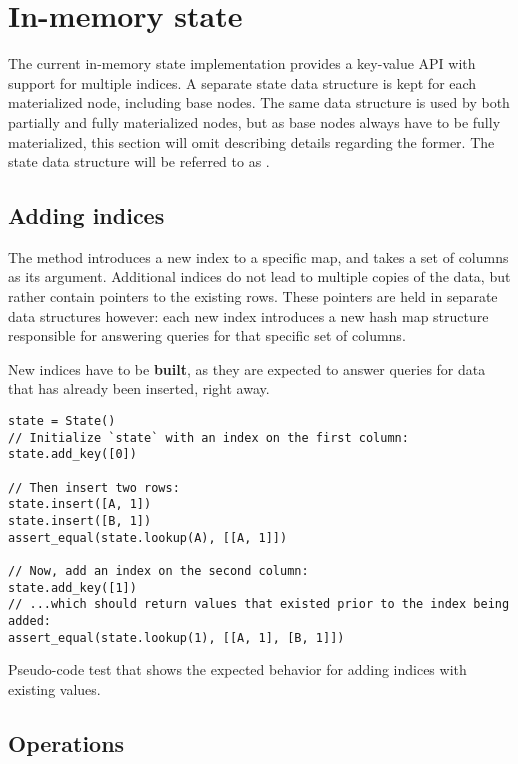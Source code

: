 \newpage

\section{In-memory state}\label{sec:in-memory-state}

The current in-memory state implementation provides a key-value API with support
for multiple indices. A separate state data structure is kept for each
materialized node, including base nodes. The same data structure is used by both
partially and fully materialized nodes, but as base nodes always have to be
fully materialized, this section will omit describing details regarding the
former. The state data structure will be referred to as .

\subsection{Adding indices}
The  method introduces a new index to a specific  map,
and takes a set of columns as its argument. Additional indices do not lead to
multiple copies of the data, but rather contain pointers to the existing rows.
These pointers are held in separate data structures however: each new index
introduces a new hash map structure responsible for answering queries for that
specific set of columns.

New indices have to be \textbf{built}, as they are expected to answer queries
for data that has already been inserted, right away.

\begin{listing}[H]
  \begin{verbatim}
state = State()
// Initialize `state` with an index on the first column:
state.add_key([0])

// Then insert two rows:
state.insert([A, 1])
state.insert([B, 1])
assert_equal(state.lookup(A), [[A, 1]])

// Now, add an index on the second column:
state.add_key([1])
// ...which should return values that existed prior to the index being added:
assert_equal(state.lookup(1), [[A, 1], [B, 1]])
  \end{verbatim}

  \caption{Pseudo-code test that shows the expected behavior for adding indices
  with existing values.}\label{lst:existing-index}
\end{listing}

\subsection{Operations}

